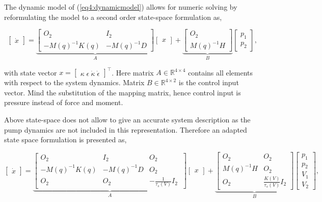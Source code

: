 The dynamic model of (\ref{eq4:dynamicmodel}) allows for numeric solving by reformulating the model to a second order state-space formulation as,

\begin{equation}
     \begin{bmatrix} \dot{x}  \end{bmatrix}   = \underbrace{  \begin{bmatrix} O_2 & I_2 \\ -M(q)^{-1}K(q)  & -M(q)^{-1} D \end{bmatrix}   }_{A} \begin{bmatrix} x \end{bmatrix}  +      \underbrace{\begin{bmatrix} O_2 \\ M(q)^{-1}H   \end{bmatrix}   }_{B}    \begin{bmatrix} p_1\\ p_2  
     \end{bmatrix}, 
     \label{eq4:SS}
\end{equation}

with state vector $x = \begin{bmatrix} \kappa \hspace{3pt} \epsilon \hspace{3pt} \dot{\kappa}  \hspace{3pt} \dot{\epsilon}  \end{bmatrix}^{\top}$. Here matrix $A \in \mathbb{R}^{4\times 4}$ contains all elements with respect to the system dynamics. Matrix $B\in\mathbb{R}^{4 \times 2}$ is the control input vector. Mind the substitution of the mapping matrix, hence control input is pressure instead of force and moment. 

Above state-space does not allow to give an accurate system description as the pump dynamics are not included in this representation. Therefore an adapted state space formulation is presented as,

\begin{equation}
     \begin{bmatrix} \dot{x}  \end{bmatrix}   =   \underbrace{ \begin{bmatrix} O_2 & I_2 & O_2 \\ -M(q)^{-1}K(q)  & -M(q)^{-1} D & O_2 \\
     O_2 & O_2    & -\frac{1}{\tau_s(V)}I_2\ \end{bmatrix}   }_A   \begin{bmatrix} x \end{bmatrix}  + \underbrace{      \begin{bmatrix} O_2 & O_2 \\ M(q)^{-1}H & O_2 \\ O_2 & \frac{K(V)}{\tau_s(V)} I_2 \end{bmatrix} }_B      \begin{bmatrix} p_1 \\ p_2  \\ V_1 \\ V_2 \end{bmatrix},
     \label{eq:ssp}
\end{equation}


